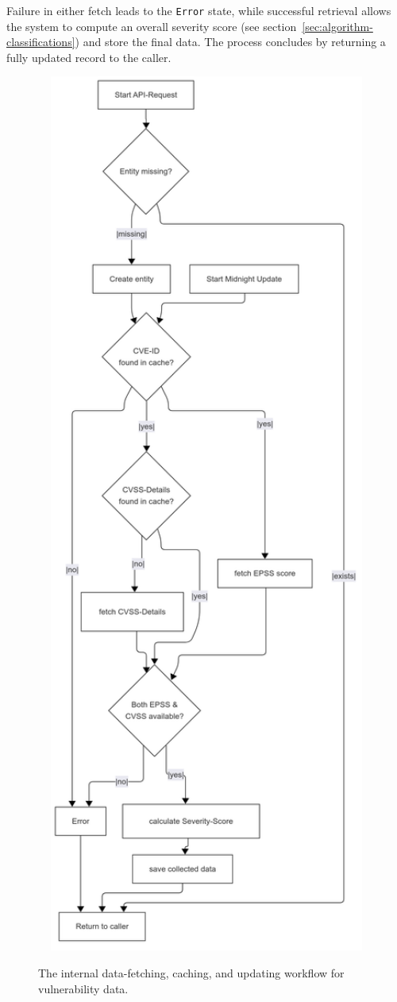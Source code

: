 Failure in either fetch leads to the \texttt{Error} state, while successful retrieval allows the system to compute an overall severity score (see section~\ref{sec:algorithm-classifications}) and store the final data. The process concludes by returning a fully updated record to the caller.

\begin{figure}[H]
\centering
\caption{The internal data-fetching, caching, and updating workflow for vulnerability data.}
\includegraphics[width=1\textwidth,height=1\textheight,keepaspectratio]{resources/Data_Flow_Vulnerability_Data.png}
\label{fig:data-fetch-flow}
\end{figure}

